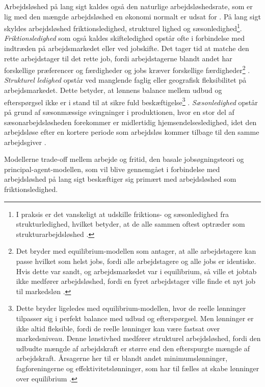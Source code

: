 Arbejdsløshed på lang sigt kaldes også den naturlige arbejdsløshedsrate, som er lig med den mængde arbejdsløshed en økonomi normalt er udsat for \parencite[592]{Mankiw2011}. På lang sigt skyldes arbejdsløshed friktionsledighed, strukturel lighed og sæsonledighed\footnote{I praksis er det vanskeligt at udskille friktions- og sæsonledighed fra strukturledighed, hvilket betyder, at de alle sammen oftest optræder som strukturarbejdsløshed \parencite{2015}.}. %
\textit{Friktionsledighed} som også kaldes skifteledighed opstår ofte i forbindelse med indtræden på arbejdsmarkedet eller ved jobskifte. Det tager tid at matche den rette arbejdstager til det rette job, fordi arbejdstagerne blandt andet har forskellige præferencer og færdigheder og jobs kræver forskellige færdigheder\footnote{Det bryder med equilibrium-modellen som antager, at alle arbejdstagere kan passe hvilket som helst jobs, fordi alle arbejdstagere og alle jobs er identiske. Hvis dette var sandt, og arbejdsmarkedet var i equilibrium, så ville et jobtab ikke medfører arbejdsløshed, fordi en fyret arbejdstager ville finde et nyt job til markedsløn \parencite[163]{Mankiw2007}.} \parencite[163]{Mankiw2007}.
\textit{Strukturel ledighed} opstår ved manglende faglig eller geografisk fleksibilitet på arbejdsmarkedet. Dette betyder, at lønnens balance mellem udbud og efterspørgsel ikke er i stand til at sikre fuld beskæftigelse\footnote{Dette bryder ligeledes med equilibrium-modellen, hvor de reelle lønninger tilpasser sig i perfekt balance med udbud og efterspørgsel. Men lønninger er ikke altid fleksible, fordi de reelle lønninger kan være fastsat over markedsniveau. Denne lønstivhed medfører strukturel arbejdsløshed, fordi den udbudte mængde af arbejdskraft er større end den efterspurgte mængde af arbejdskraft. Årsagerne her til er blandt andet minimumslønninger, fagforeningerne og effektivitetslønninger, som har til fælles at skabe lønninger over equilibrium \parencite[165]{Mankiw2007}.} \parencite[600]{Mankiw2011}.
\textit{Sæsonledighed} opstår på grund af sæsonmæssige svingninger i produktionen, hvor en stor del af sæsonarbejdsløsheden forekommer er midlertidig hjemsendelsesledighed, idet den arbejdsløse efter en kortere periode som arbejdsløs kommer tilbage til den samme arbejdsgiver \parencite{2015}.

Modellerne trade-off mellem arbejde og fritid, den basale jobsøgningsteori og principal-agent-modellen, som vil blive gennemgået i forbindelse med arbejdsløshed på lang sigt beskæftiger sig primært med arbejdsløshed som friktionsledighed.

